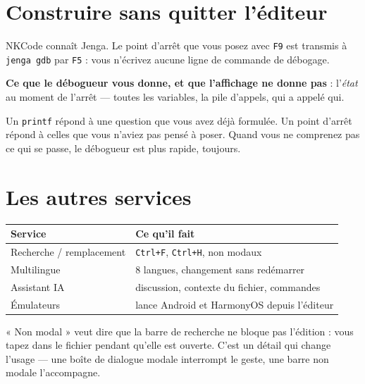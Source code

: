 \section{Construire sans quitter l'éditeur}

NKCode connaît Jenga. Le point d'arrêt que vous posez avec \texttt{F9} est
transmis à \texttt{jenga gdb} par \texttt{F5} : vous n'écrivez aucune ligne de
commande de débogage.

\begin{nkretenir}
\textbf{Ce que le débogueur vous donne, et que l'affichage ne donne pas} :
l'\emph{état} au moment de l'arrêt --- toutes les variables, la pile d'appels,
qui a appelé qui.

Un \texttt{printf} répond à une question que vous avez déjà formulée. Un point
d'arrêt répond à celles que vous n'aviez pas pensé à poser. Quand vous ne
comprenez pas ce qui se passe, le débogueur est plus rapide, toujours.
\end{nkretenir}

\section{Les autres services}

\begin{center}
\begin{tabular}{@{}ll@{}}
\toprule
\textbf{Service} & \textbf{Ce qu'il fait} \\
\midrule
Recherche / remplacement & \texttt{Ctrl+F}, \texttt{Ctrl+H}, non modaux \\
Multilingue & 8 langues, changement sans redémarrer \\
Assistant IA & discussion, contexte du fichier, commandes \\
Émulateurs & lance Android et HarmonyOS depuis l'éditeur \\
\bottomrule
\end{tabular}
\end{center}

\begin{nkretenir}
« Non modal » veut dire que la barre de recherche ne bloque pas l'édition : vous
tapez dans le fichier pendant qu'elle est ouverte. C'est un détail qui change
l'usage --- une boîte de dialogue modale interrompt le geste, une barre non
modale l'accompagne.
\end{nkretenir}

